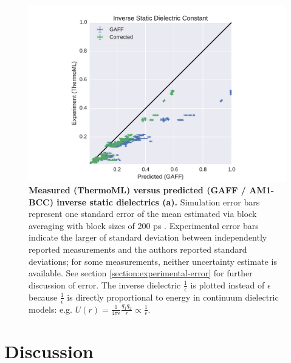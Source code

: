 \documentclass[aps,pre,twocolumn,nofootinbib,superscriptaddress,linenumbers]{revtex4-1}
\begin{document}

\begin{figure}
\includegraphics[width=\columnwidth]{./figures/dielectrics_thermoml.pdf}

\caption{{\bf Measured (ThermoML) versus predicted (GAFF / AM1-BCC) inverse static dielectrics (a).}
Simulation error bars represent one standard error of the mean estimated via block averaging with block sizes of 200 ps \cite{flyvbjerg1989error}.  
Experimental error bars indicate the larger of standard deviation between independently reported measurements and the authors reported standard deviations; for some measurements, neither uncertainty estimate is available.  
See section \ref{section:experimental-error} for further discussion of error.  
The inverse dielectric $\frac{1}{\epsilon}$ is plotted instead of $\epsilon$ because $\frac{1}{\epsilon}$ is directly proportional to energy in continuum dielectric models: e.g. $U(r) = \frac{1}{4 \pi \epsilon} \frac{q_1 q_2}{r} \propto \frac{1}{\epsilon}$.
}
\label{figure:Dielectric}
\end{figure}


\section{Discussion}
\end{document}
